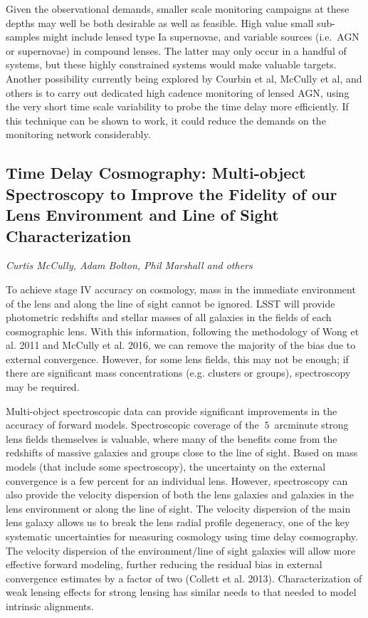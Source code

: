 Given the observational demands,
smaller scale monitoring campaigns at these depths may well be
both desirable as well as feasible. High value small sub-samples might include
lensed type Ia supernovae, and variable sources (i.e.\ AGN or
supernovae) in compound lenses.
The latter may only occur in a handful of systems, but
these highly constrained systems would make valuable targets. Another
possibility currently being explored by Courbin et al, McCully et al,
and others is to carry out dedicated high cadence monitoring of lensed
AGN, using the very short time scale variability to probe the time delay
more efficiently. If this technique can be shown to work, it could
reduce the demands on the monitoring network considerably.


\subsection{Time Delay Cosmography: Multi-object Spectroscopy to Improve the Fidelity of our Lens Environment and Line of Sight Characterization}
{\it Curtis McCully, Adam Bolton, Phil Marshall and others}

To achieve stage IV accuracy on cosmology, mass in the immediate environment of the lens and along the line of sight cannot be ignored. LSST will provide photometric redshifts and stellar masses of all
galaxies in the fields of each cosmographic lens. With this information, following the methodology of Wong et al. 2011 and McCully et al. 2016, we can remove the majority of the bias due to external convergence. However, for some lens fields, this may not be enough; if there are significant mass concentrations (e.g. clusters or groups), spectroscopy may be required.  

Multi-object spectroscopic data can provide significant improvements in
the accuracy of forward models.
Spectroscopic coverage of the $~5$~arcminute strong lens fields
themselves is valuable, where many of the benefits come from the redshifts of
massive galaxies and groups close to the line of sight. Based on mass models (that include some spectroscopy), the uncertainty on the external convergence is a few percent for an individual lens. However, spectroscopy can also provide the velocity dispersion of both the lens galaxies and galaxies in the lens environment or along the line of sight. The velocity dispersion of the main lens galaxy allows us to break the lens radial profile degeneracy, one of the key systematic uncertainties for measuring cosmology using time delay cosmography. The velocity dispersion of the environment/line of sight galaxies will allow more effective forward modeling, further reducing the residual bias in external convergence estimates by a factor of two (Collett et al. 2013). Characterization of weak lensing effects for strong lensing has similar needs to that needed to model intrinsic alignments.


